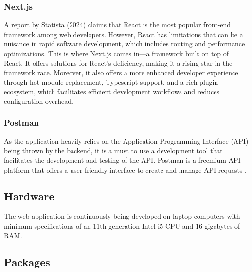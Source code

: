 \subsubsection{Next.js}
A report by Statista (2024) claims that React is the most popular front-end framework among web developers. However, React has limitations that can be a nuisance in rapid software development, which includes routing and performance optimizations. This is where Next.js comes in—a framework built on top of React. It offers solutions for React's deficiency, making it a rising star in the framework race. Moreover, it also offers a more enhanced developer experience through hot module replacement, Typescript support, and a rich plugin ecosystem, which facilitates efficient development workflows and reduces configuration overhead.

\subsubsection{Postman}
As the application heavily relies on the Application Programming Interface (API) being thrown by the backend, it is a must to use a development tool that facilitates the development and testing of the API. Postman is a freemium API platform that offers a user-friendly interface to create and manage API requests \cite{postman-no-date}. 

\subsection{Hardware}
The web application is continuously being developed on laptop computers with minimum specifications of an 11th-generation Intel i5 CPU and 16 gigabytes of RAM.

\subsection{Packages}

